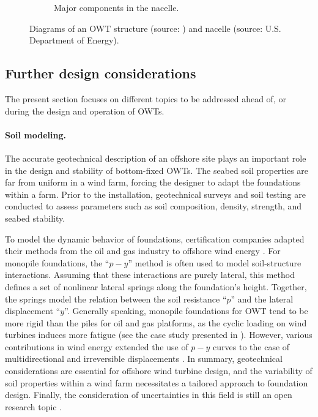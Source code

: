 \begin{figure}
\begin{subfigure}[b]{0.48\textwidth}
        \caption{Major components in the nacelle.}
        \label{fig:nacelle_components}
    \end{subfigure}
    \caption{Diagrams of an OWT structure (source: \citealp{chen_2018_owt_diagram}) and nacelle (source: U.S. Department of Energy).}
    \label{fig:owt_diagram}
\end{figure}

\subsection{Further design considerations}
The present section focuses on different topics to be addressed ahead of, or during the design and operation of OWTs.

\paragraph{Soil modeling.}
The accurate geotechnical description of an offshore site plays an important role in the design and stability of bottom-fixed OWTs. 
The seabed soil properties are far from uniform in a wind farm, forcing the designer to adapt the foundations within a farm. 
Prior to the installation, geotechnical surveys and soil testing are conducted to assess parameters such as soil composition, density, strength, and seabed stability. 

To model the dynamic behavior of foundations, certification companies adapted their methods from the oil and gas industry to offshore wind energy \citep{dnv_2018_soil}. 
For monopile foundations, the ``$p-y$'' method is often used to model soil-structure interactions. 
Assuming that these interactions are purely lateral, this method defines a set of nonlinear lateral springs along the foundation's height.  
Together, the springs model the relation between the soil resistance ``$p$'' and the lateral displacement ``$y$''. 
Generally speaking, monopile foundations for OWT tend to be more rigid than the piles for oil and gas platforms, as the cyclic loading on wind turbines induces more fatigue (see the case study presented in \citealp{le_2014_geotech_casestudy}).  
However, various contributions in wind energy extended the use of $p-y$ curves to the case of multidirectional and irreversible displacements \citep{lovera_2019_thesis}. 
In summary, geotechnical considerations are essential for offshore wind turbine design, and the variability of soil properties within a wind farm necessitates a tailored approach to foundation design. 
Finally, the consideration of uncertainties in this field is still an open research topic \citep{reale_2021_OWT_soil_uncertainties}.

